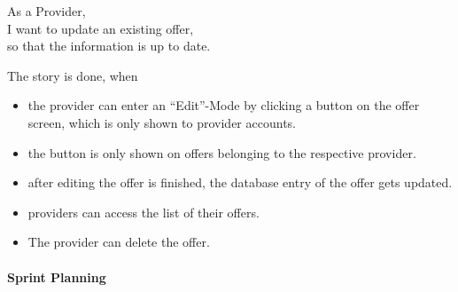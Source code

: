 As a Provider,\\
I want to update an existing offer,\\
so that the information is up to date.

The story is done, when
\begin{itemize}
    \item the provider can enter an “Edit”-Mode by clicking a button on the offer screen, which is only shown to provider accounts.
    \item the button is only shown on offers belonging to the respective provider.
    \item after editing the offer is finished, the database entry of the offer gets updated.
    \item providers can access the list of their offers.
    \item The provider can delete the offer.
\end{itemize}

\paragraph{Sprint Planning}




